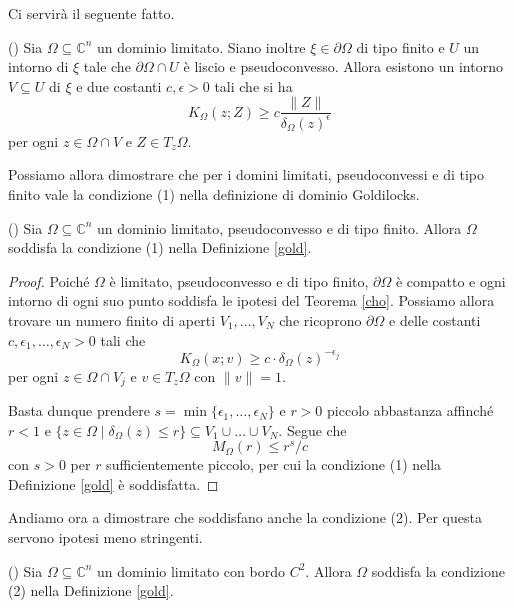 Ci servirà il seguente fatto.

\begin{thm} \label{cho}
    (\cite[Theorem 1]{Ch}) Sia $\Omega\subseteq\mathbb{C}^n$ un dominio limitato. Siano inoltre $\xi\in\partial\Omega$ di tipo finito e $U$ un intorno di $\xi$ tale che $\partial\Omega\cap U$ è liscio e pseudoconvesso. Allora esistono un intorno $V\subseteq U$ di $\xi$ e due costanti $c,\epsilon>0$ tali che si ha
    $$K_\Omega(z;Z) \ge c\frac{\|Z\|}{\delta_\Omega(z)^\epsilon}$$
    per ogni $z\in\Omega\cap V$ e $Z\in T_z\Omega$.
\end{thm}

Possiamo allora dimostrare che per i domini limitati, pseudoconvessi e di tipo finito vale la condizione (1) nella definizione di dominio Goldilocks.

\begin{cor} \label{finito_is_1}
    (\cite[Lemma 2.6]{BZ1}) Sia $\Omega\subseteq\mathbb{C}^n$ un dominio limitato, pseudoconvesso e di tipo finito. Allora $\Omega$ soddisfa la condizione (1) nella Definizione \ref{gold}.
\end{cor}

\begin{proof}
    Poiché $\Omega$ è limitato, pseudoconvesso e di tipo finito, $\partial\Omega$ è compatto e ogni intorno di ogni suo punto soddisfa le ipotesi del Teorema \ref{cho}. Possiamo allora trovare un numero finito di aperti $V_1,\dots, V_N$ che ricoprono $\partial\Omega$ e delle costanti $c,\epsilon_1,\dots,\epsilon_N>0$ tali che
    $$K_\Omega(x;v) \ge c\cdot\delta_\Omega(z)^{-\epsilon_j}$$
    per ogni $z\in\Omega\cap V_j$ e $v\in T_z\Omega$ con $\|v\|=1$.

    Basta dunque prendere $s=\min\{\epsilon_1,\dots,\epsilon_N\}$ e $r>0$ piccolo abbastanza affinché $r<1$ e $\{z\in\Omega\mid\delta_\Omega(z) \le r\}\subseteq V_1\cup\dots\cup V_N$. Segue che
    $$M_\Omega(r) \le r^s/c$$
    con $s>0$ per $r$ sufficientemente piccolo, per cui la condizione (1) nella Definizione \ref{gold} è soddisfatta.
\end{proof}

Andiamo ora a dimostrare che soddisfano anche la condizione (2). Per questa servono ipotesi meno stringenti.

\begin{prop} \label{finito_is_2}
    (\cite[Proposition 1.2]{A1}) Sia $\Omega\subseteq\mathbb{C}^n$ un dominio limitato con bordo $C^2$. Allora $\Omega$ soddisfa la condizione (2) nella Definizione \ref{gold}.
\end{prop}

